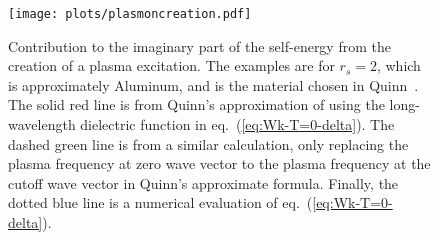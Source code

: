\documentclass[physics,phd,nolot,nolof]{uccthesis}%
\begin{document}
{%
\begin{figure}[htb]
  \begin{center}
    \texttt{[image: plots/plasmoncreation.pdf]}
  \end{center}
  \caption{Contribution to the imaginary part of the self-energy from the creation of a plasma excitation. 
  The examples are for $r_s =2$, which is approximately Aluminum, and is the 
  material chosen in Quinn~\cite{Quinn1962}.
  The solid red line is from Quinn's approximation of using the long-wavelength 
  dielectric function in eq.~(\ref{eq:Wk-T=0-delta}).
  The dashed green line is from a similar calculation, only replacing the 
  plasma frequency at zero wave vector to the plasma frequency at the cutoff
  wave vector in Quinn's approximate formula.
  Finally, the dotted blue line is a numerical evaluation of eq.~(\ref{eq:Wk-T=0-delta}).}
  \label{fig:selfenergyT=0-plasmon}
\end{figure}
}
\end{document}
